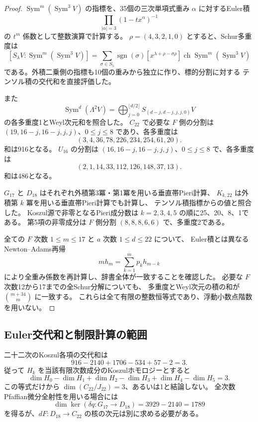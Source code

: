 \documentclass[a4paper,11pt]{ltjsarticle}
\theoremstyle{definition}
\begin{document}
\begin{proof}
$\operatorname{Sym}^m(\operatorname{Sym}^3V)$ の指標を、35個の三次単項式重み
$\alpha$ に対するEuler積
\[
 \prod_{|\alpha|=3}(1-tx^\alpha)^{-1}
\]
の $t^m$ 係数として整数演算で計算する。
$\rho=(4,3,2,1,0)$ とすると、Schur多重度は
\[
 [S_\lambda V:\operatorname{Sym}^m(\operatorname{Sym}^3V)]
 =\sum_{\sigma\in S_5}\operatorname{sgn}(\sigma)
 [x^{\lambda+\rho-\sigma\rho}]
 \operatorname{ch}\operatorname{Sym}^m(\operatorname{Sym}^3V)
\]
である。外積二乗側の指標も10個の重みから独立に作り、標的分割に対する
テンソル積の交代和を直接評価した。

また
\[
 \operatorname{Sym}^{d}(\Lambda^2V)
 =\bigoplus_{j=0}^{\lfloor d/2\rfloor}S_{(d-j,d-j,j,j,0)}V
\]
の各多重度1とWeyl次元和を照合した。
$C_{22}$ で必要な $F$ 側の分割は
$(19,16-j,16-j,j,j)$、$0\leq j\leq8$ であり、各多重度は
\[
 (3,4,36,78,226,234,254,61,20).
\]
和は916となる。
$U_{16}$ の分割は $(16,16-j,16-j,j,j)$、$0\leq j\leq8$ で、各多重度は
\[
 (2,1,14,33,112,126,148,37,13).
\]
和は486となる。

$G_{17}$ と $D_{18}$ はそれぞれ外積第3冪・第1冪を用いる垂直帯Pieri計算、
$K_{k,22}$ は外積第 $k$ 冪を用いる垂直帯Pieri計算でも計算し、
テンソル積指標からの値と照合した。
Koszul源で非零となるPieri成分数は $k=2,3,4,5$ の順に25、20、8、1である。
第5項の非零成分は $F$ 側分割 $(8,8,8,6,6)$ で、多重度2である。

全ての $F$ 次数 $1\leq m\leq17$ と $a$ 次数 $1\leq d\leq22$ について、
Euler積とは異なるNewton--Adams再帰
\[
 m h_m=\sum_{k=1}^m p_kh_{m-k}
\]
により全重み係数を再計算し、辞書全体が一致することを確認した。
必要な $F$ 次数12から17までの全Schur分解についても、
多重度とWeyl次元の積の和が $\binom{m+34}{m}$ に一致する。
これらは全て有限の整数恒等式であり、浮動小数点階数を用いない。
\end{proof}

\subsection{Euler交代和と制限計算の範囲}

二十二次のKoszul各項の交代和は
\[
 916-2140+1706-534+57-2=3.
\]
従って $H_k$ を当該有限次数成分のKoszulホモロジーとすると
\[
 \dim H_0-\dim H_1+\dim H_2-\dim H_3+\dim H_4-\dim H_5=3.
\]
この等式だけから $\dim(C_{22}/J_{22})=3$、あるいは1と結論しない。
全次数Pfaffian微分全射性を用いる場合には
\[
 \dim\ker(\delta q:G_{17}\longrightarrow D_{18})=3929-2140=1789
\]
を得るが、$dF:D_{18}\to C_{22}$ の核の次元は別に求める必要がある。
\end{document}
